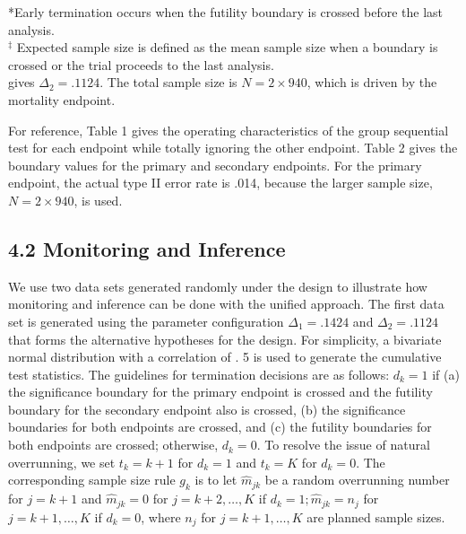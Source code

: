 \documentclass[10pt]{article}
\begin{document}
*Early termination occurs when the futility boundary is crossed before the last analysis.\\
${ }^{\ddagger}$ Expected sample size is defined as the mean sample size when a boundary is crossed or the trial proceeds to the last analysis.\\
gives $\Delta_{2}=.1124$. The total sample size is $N=2 \times 940$, which is driven by the mortality endpoint.

For reference, Table 1 gives the operating characteristics of the group sequential test for each endpoint while totally ignoring the other endpoint. Table 2 gives the boundary values for the primary and secondary endpoints. For the primary endpoint, the actual type II error rate is .014, because the larger sample size, $N=2 \times 940$, is used.

\subsection*{4.2 Monitoring and Inference}
We use two data sets generated randomly under the design to illustrate how monitoring and inference can be done with the unified approach. The first data set is generated using the parameter configuration $\Delta_{1}=.1424$ and $\Delta_{2}=.1124$ that forms the alternative hypotheses for the design. For simplicity, a bivariate normal distribution with a correlation of . 5 is used to generate the cumulative test statistics. The guidelines for termination decisions are as follows: $d_{k}=1$ if (a) the significance boundary for the primary endpoint is crossed and the futility boundary for the secondary endpoint also is crossed, (b) the significance boundaries for both endpoints are crossed, and (c) the futility boundaries for both endpoints are crossed; otherwise, $d_{k}=0$. To resolve the issue of natural overrunning, we set $t_{k}=k+1$ for $d_{k}=1$ and $t_{k}=K$ for $d_{k}=0$. The corresponding sample size rule $g_{k}$ is to let $\hat{m}_{j k}$ be a random overrunning number for $j=k+1$ and $\hat{m}_{j k}=0$ for $j=k+2, \ldots, K$ if $d_{k}=1 ; \hat{m}_{j k}=n_{j}$ for $j=k+1, \ldots, K$ if $d_{k}=0$, where $n_{j}$ for $j=k+1, \ldots, K$ are planned sample sizes.
\end{document}
